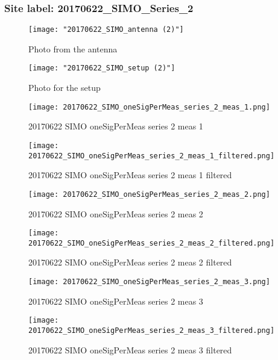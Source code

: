 \subsubsection{Site label: 20170622\_SIMO\_Series\_2}
\begin{figure}[ht] \caption{Photo from the antenna}
\texttt{[image: "20170622\_SIMO\_antenna (2)"]}\centering\end{figure}
\begin{figure}[ht] \caption{Photo for the setup}
\texttt{[image: "20170622\_SIMO\_setup (2)"]}\centering\end{figure}
\begin{figure}[ht] \caption{20170622 SIMO oneSigPerMeas series 2 meas 1}
\texttt{[image: 20170622\_SIMO\_oneSigPerMeas\_series\_2\_meas\_1.png]}\centering\end{figure}
\begin{figure}[ht] \caption{20170622 SIMO oneSigPerMeas series 2 meas 1 filtered}
\texttt{[image: 20170622\_SIMO\_oneSigPerMeas\_series\_2\_meas\_1\_filtered.png]}\centering\end{figure}
\begin{figure}[ht] \caption{20170622 SIMO oneSigPerMeas series 2 meas 2}
\texttt{[image: 20170622\_SIMO\_oneSigPerMeas\_series\_2\_meas\_2.png]}\centering\end{figure}
\begin{figure}[ht] \caption{20170622 SIMO oneSigPerMeas series 2 meas 2 filtered}
\texttt{[image: 20170622\_SIMO\_oneSigPerMeas\_series\_2\_meas\_2\_filtered.png]}\centering\end{figure}
\begin{figure}[ht] \caption{20170622 SIMO oneSigPerMeas series 2 meas 3}
\texttt{[image: 20170622\_SIMO\_oneSigPerMeas\_series\_2\_meas\_3.png]}\centering\end{figure}
\begin{figure}[ht] \caption{20170622 SIMO oneSigPerMeas series 2 meas 3 filtered}
\texttt{[image: 20170622\_SIMO\_oneSigPerMeas\_series\_2\_meas\_3\_filtered.png]}\centering\end{figure}
\clearpage
